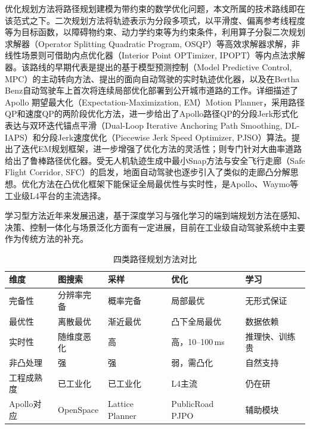 优化规划方法将路径规划建模为带约束的数学优化问题，本文所属的技术路线即在该范式之下。二次规划方法将轨迹表示为分段多项式，以平滑度、偏离参考线程度等为目标函数，以障碍物约束、动力学约束等为约束条件，利用算子分裂二次规划求解器（Operator Splitting Quadratic Program, OSQP）\cite{stellato2020osqp}等高效求解器求解，非线性场景则可借助内点优化器（Interior Point OPTimizer, IPOPT）\cite{wachter2006ipopt}等内点法求解器。该路线的早期代表是\citet{borrelli2005mpc}提出的基于模型预测控制（Model Predictive Control, MPC）的主动转向方法、\citet{xu2012realtime}提出的面向自动驾驶的实时轨迹优化器，以及\citet{ziegler2014}在Bertha Benz自动驾驶车上首次将连续局部优化部署到公开城市道路的工作。\citet{fan2018baidu}详细描述了Apollo 期望最大化（Expectation-Maximization, EM）Motion Planner，采用路径QP和速度QP的两阶段优化方法，\citet{zhou2021pathqp,zhou2021dliaps}进一步给出了Apollo路径QP的分段Jerk形式化表达与双环迭代锚点平滑（Dual-Loop Iterative Anchoring Path Smoothing, DL-IAPS）和分段Jerk速度优化（Piecewise Jerk Speed Optimizer, PJSO）算法。\citet{chen2019em}提出了迭代EM规划框架，进一步增强了优化方法的灵活性；\citet{sun2022robust}则专门针对大曲率道路给出了鲁棒路径优化器。受无人机轨迹生成中最小Snap方法\cite{mellinger2011minsnap}与安全飞行走廊（Safe Flight Corridor, SFC）\cite{liu2017sfc}的启发，地面自动驾驶也逐步引入了类似的走廊凸分解思想。优化方法在凸优化框架下能保证全局最优性与实时性，是Apollo、Waymo等工业级L4平台的主流选择。

学习型方法近年来发展迅速，基于深度学习与强化学习的端到端规划方法\cite{zhang2021autonomous,alahi2016social,li2024decision,shalevshwartz2017rss}在感知、决策、控制一体化与场景泛化方面有一定进展，目前在工业级自动驾驶系统中主要作为传统方法的补充。

\begin{table}[H]
\centering
\caption{四类路径规划方法对比}
\label{tab:method_compare}
\small
\begin{tabular}{@{}p{2.3cm}p{2.2cm}p{2.2cm}p{2.2cm}p{2.3cm}@{}}
\toprule
\textbf{维度} & \textbf{图搜索} & \textbf{采样} & \textbf{优化} & \textbf{学习} \\
\midrule
完备性 & 分辨率完备 & 概率完备 & 局部最优 & 无形式保证 \\
最优性 & 离散最优 & 渐近最优 & 凸下全局最优 & 数据依赖 \\
实时性 & 随维度恶化 & 高 & 高，10--100\,ms & 推理快、训练贵 \\
非凸处理 & 强 & 强 & 弱，需凸化 & 自然支持 \\
工程成熟度 & 已工业化 & 已工业化 & L4主流 & 仍在研 \\
Apollo对应 & OpenSpace & Lattice Planner & PublicRoad PJPO & 辅助模块 \\
\bottomrule
\end{tabular}
\end{table}


